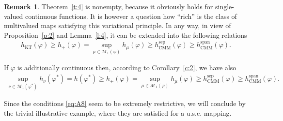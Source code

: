 \documentclass[12pt]{amsart}
\theoremstyle{definition}
\newtheorem{remark}{Remark}
\newcommand{\M}{{\mathcal{M}}}
\newcommand{\vp}{\varphi}
\newcommand{\spa}{\operatorname{span}}
\newcommand{\sepp}{\operatorname{sep}}
\newcommand{\KT}{\operatorname{KT}}
\newcommand{\hKT}{h_{\KT}}
\newcommand{\CM}{\operatorname{CMM}}
\newcommand{\hCM}{h_{\CM}}
\begin{document}
\begin{remark}\label{r:7}
Theorem~\ref{t:4} is nonempty, because it obviously holds for single-valued continuous functions. It is however a question how ``rich'' is the class of multivalued maps satisfying this variational principle. In any way, in view of Proposition~\ref{p:2} and Lemma~\ref{l:4}, it can be extended into the following relations
\begin{align*}
\hKT(\vp) \geq h_+(\vp) = \sup_{\mu\in\M_1(\vp)} h_\mu(\vp) \geq \hCM^{\sepp}(\vp) \geq \hCM^{\spa}(\vp).
\end{align*}

If $\vp$ is additionally continuous then, according to Corollary~\ref{c:2}, we have also
\begin{align*}
\sup_{\nu\in\M_1(\vp^*)} h_\nu(\vp^*) = h(\vp^*) \geq h_+(\vp) = \sup_{\mu\in\M_1(\vp)} h_\mu(\vp) \geq \hCM^{\sepp}(\vp) \geq \hCM^{\spa}(\vp).
\end{align*}
\end{remark}


Since the conditions \eqref{eq:A8} seem to be extremely restrictive, we will conclude by the trivial illustrative example, where they are satisfied for a u.s.c. mapping.

\end{document}
